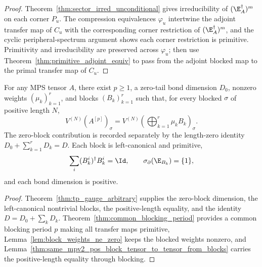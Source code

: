 \begin{proof}\leanok
    Theorem~\ref{thm:sector_irred_unconditional} gives irreducibility of
    $(\E_A^\dagger)^m$ on each corner $P_u$. The compression equivalences
    $\varphi_u$ intertwine the adjoint transfer map of $C_u$ with the
    corresponding corner restriction of $(\E_A^\dagger)^m$, and the cyclic
    peripheral-spectrum argument shows each corner restriction is primitive.
    Primitivity and irreducibility are preserved across $\varphi_u$; then use
    Theorem~\ref{thm:primitive_adjoint_equiv} to pass from the adjoint blocked
    map to the primal transfer map of $C_u$.
\end{proof}

\begin{theorem}%
    \label{thm:tp_primitive_blockdecomp}
    \leanok
    For any MPS tensor $A$, there exist $p\ge 1$, a zero-tail bond dimension
    $D_0$, nonzero weights $(\mu_k)_{k=1}^r$, and blocks $(B_k)_{k=1}^r$ such
    that, for every blocked $\sigma$ of positive length $N$,
    \[
        V^{(N)}\!(A^{[p]})_\sigma
        = V^{(N)}\!(\textstyle\bigoplus_{k=1}^{r} \mu_k B_k)_\sigma.
    \]
    The zero-block contribution is recorded separately by the length-zero
    identity $D_0 + \sum_{k=1}^{r} D_k = D$. Each block is left-canonical and
    primitive,
    \[
        \sum_i (B_k^i)^\dagger B_k^i = \Id,
        \qquad
        \sigma_\partial(\E_{B_k})=\{1\},
    \]
    and each bond dimension is positive.
\end{theorem}

\begin{proof}\leanok
    Theorem~\ref{thm:tp_gauge_arbitrary} supplies the zero-block dimension, the
    left-canonical nontrivial blocks, the positive-length equality, and the
    identity $D = D_0 + \sum_k D_k$.
    Theorem~\ref{thm:common_blocking_period} provides a common blocking period
    $p$ making all transfer maps primitive,
    Lemma~\ref{lem:block_weights_ne_zero} keeps the blocked weights nonzero, and
    Lemma~\ref{thm:same_mpv2_pos_block_tensor_to_tensor_from_blocks} carries
    the positive-length equality through blocking.
\end{proof}
